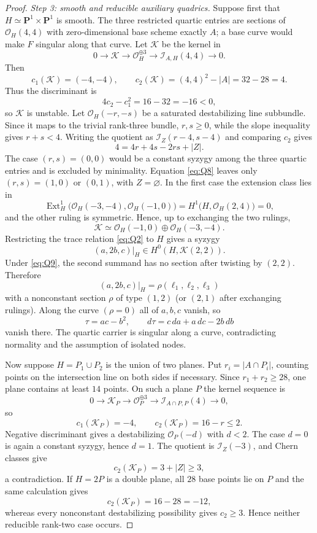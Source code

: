 \documentclass[11pt,reqno]{amsart}
\theoremstyle{remark}
\newcommand{\PP}{\mathbf P}
\newcommand{\cO}{\mathcal O}
\newcommand{\cI}{\mathcal I}
\begin{document}
\begin{proof}
\emph{Step 3: smooth and reducible auxiliary quadrics.}
Suppose first that $H\simeq\PP^1\times\PP^1$ is smooth.  The three restricted quartic entries are sections of $\cO_H(4,4)$ with zero-dimensional base scheme exactly $A$; a base curve would make $F$ singular along that curve.  Let $\mathcal K$ be the kernel in
\[
0\longrightarrow\mathcal K\longrightarrow\cO_H^{\oplus3}
\longrightarrow\cI_{A,H}(4,4)\longrightarrow0. \tag{Q7}\label{eq:Q7}
\]
Then
\[
c_1(\mathcal K)=(-4,-4),
\qquad
c_2(\mathcal K)=(4,4)^2-|A|=32-28=4.
\]
Thus the discriminant is
\[
4c_2-c_1^2=16-32=-16<0,
\]
so $\mathcal K$ is unstable.  Let $\cO_H(-r,-s)$ be a saturated destabilizing line subbundle.  Since it maps to the trivial rank-three bundle, $r,s\ge0$, while the slope inequality gives $r+s<4$.  Writing the quotient as $\cI_Z(r-4,s-4)$ and comparing $c_2$ gives
\[
4=4r+4s-2rs+|Z|. \tag{Q8}\label{eq:Q8}
\]
The case $(r,s)=(0,0)$ would be a constant syzygy among the three quartic entries and is excluded by minimality.  Equation \eqref{eq:Q8} leaves only $(r,s)=(1,0)$ or $(0,1)$, with $Z=\varnothing$.  In the first case the extension class lies in
\[
\operatorname{Ext}^1_H\!\bigl(\cO_H(-3,-4),\cO_H(-1,0)\bigr)
=H^1\bigl(H,\cO_H(2,4)\bigr)=0,
\]
and the other ruling is symmetric.  Hence, up to exchanging the two rulings,
\[
\mathcal K\simeq\cO_H(-1,0)\oplus\cO_H(-3,-4). \tag{Q9}\label{eq:Q9}
\]
Restricting the trace relation \eqref{eq:Q2} to $H$ gives a syzygy
\[
(a,2b,c)|_H\in H^0(H,\mathcal K(2,2)).
\]
Under \eqref{eq:Q9}, the second summand has no section after twisting by $(2,2)$.  Therefore
\[
(a,2b,c)|_H=\rho(\ell_1,\ell_2,\ell_3)
\]
with a nonconstant section $\rho$ of type $(1,2)$ (or $(2,1)$ after exchanging rulings).  Along the curve $(\rho=0)$ all of $a,b,c$ vanish, so
\[
\tau=ac-b^2,
\qquad d\tau=c\,da+a\,dc-2b\,db
\]
vanish there.  The quartic carrier is singular along a curve, contradicting normality and the assumption of isolated nodes.

Now suppose $H=P_1\cup P_2$ is the union of two planes.  Put $r_i=|A\cap P_i|$, counting points on the intersection line on both sides if necessary.  Since $r_1+r_2\ge28$, one plane contains at least $14$ points.  On such a plane $P$ the kernel sequence is
\[
0\to\mathcal K_P\to\cO_P^{\oplus3}
\to\cI_{A\cap P,P}(4)\to0,
\]
so
\[
c_1(\mathcal K_P)=-4,
\qquad c_2(\mathcal K_P)=16-r\le2.
\]
Negative discriminant gives a destabilizing $\cO_P(-d)$ with $d<2$.  The case $d=0$ is again a constant syzygy, hence $d=1$.  The quotient is $\cI_Z(-3)$, and Chern classes give
\[
c_2(\mathcal K_P)=3+|Z|\ge3,
\]
a contradiction.  If $H=2P$ is a double plane, all $28$ base points lie on $P$ and the same calculation gives
\[
c_2(\mathcal K_P)=16-28=-12,
\]
whereas every nonconstant destabilizing possibility gives $c_2\ge3$.  Hence neither reducible rank-two case occurs.


\end{proof}
\end{document}
